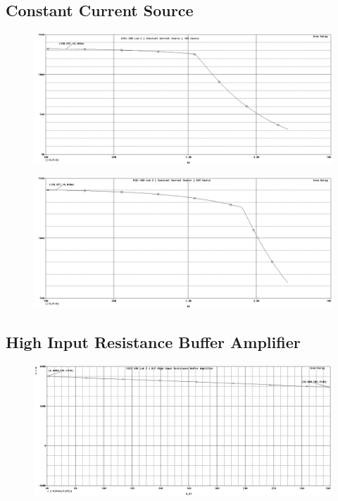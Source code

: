 \subsection{Constant Current Source}
\begin{figure}[H]
	\centering
	\includegraphics[width=\pwidth]{img/plot/constantCurrent16Plot.PNG}
	\parbox{\pwidth}{
	\caption{}
	\label{fig:ccPlot16}}
\end{figure}

\begin{figure}[H]
	\centering
	\includegraphics[width=\pwidth]{img/plot/constantCurrent32Plot.PNG}
	\parbox{\pwidth}{
	\caption{}
	\label{fig:ccPlot32}}
\end{figure}

\subsection{High Input Resistance Buffer Amplifier}
\begin{figure}[H]
	\centering
	\includegraphics[width=\pwidth]{img/plot/bjtPlotR.PNG}
	\parbox{\pwidth}{
	\caption{}
	\label{fig:bjtPlotR}}
\end{figure}

